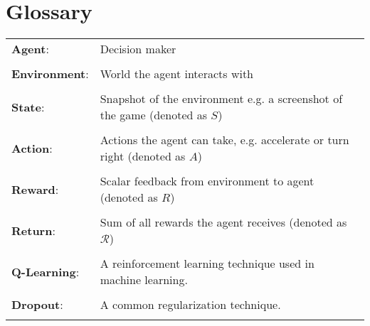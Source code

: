 \chapter{Glossary}\label{Glossary}

\begin{table}[!h]  %
\begin{tabular}{ p{} p{} }

{\bf Agent}: &		Decision maker \\ \\

{\bf Environment}: & World the agent interacts with\\ \\

{\bf State}:  &  Snapshot of the environment e.g. a screenshot of the game (denoted as $S$)\\ \\

{\bf Action}: & Actions the agent can take, e.g. accelerate or turn right (denoted as $A$)\\ \\

{\bf Reward}: & Scalar feedback from environment to agent (denoted as $R$)\\ \\

{\bf Return}: & Sum of all rewards the agent receives (denoted as $\mathcal{R}$) \\ \\

{\bf Q-Learning}: & A reinforcement learning technique used in machine learning. \\ \\

{\bf Dropout}: & A common regularization technique. \\ \\

\end{tabular}
\end{table}

\endinput

